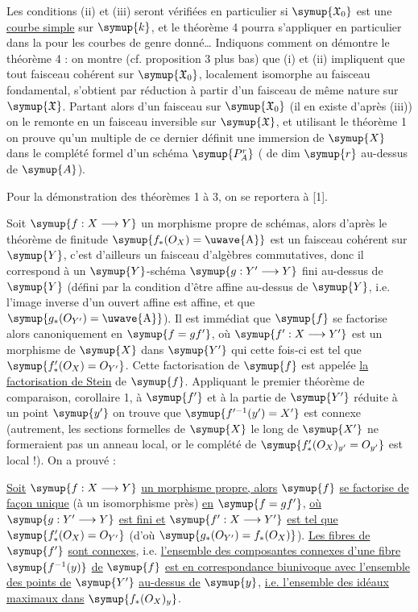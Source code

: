 Les conditions (ii) et (iii) seront vérifiées en particulier
si $\symup{\mathfrak X_0}$ est une \uline{courbe simple} sur $\symup{k}$, et le théorème 4 pourra
s'appliquer en particulier dans la  pour les courbes de
genre donné\ldots{} Indiquons comment on démontre le théorème 4 : on montre
(cf. proposition 3 plus bas) que (i) et (ii) impliquent que
tout faisceau cohérent sur $\symup{\mathfrak X_0}$, localement isomorphe au faisceau
fondamental, s'obtient par réduction à partir d'un faisceau de même nature sur
$\symup{\mathfrak X}$. Partant alors d'un faisceau  sur $\symup{\mathfrak X_0}$ (il
en existe d'après (iii)) on le remonte en un faisceau inversible sur
$\symup{\mathfrak X}$, et utilisant le théorème 1 on prouve qu'un multiple de ce
dernier définit une immersion de $\symup{X}$ dans le complété formel d'un
schéma $\symup{P_A^r}$ ( de dim $\symup{r}$ au-dessus de
$\symup{A}$).

Pour la démonstration des théorèmes 1 à 3, on se reportera à [1].


Soit $\symup{f:X\longrightarrow Y}$ un morphisme propre de schémas, alors d'après le
théorème de finitude $\symup{f_*(O_X)=\text{\uwave{A}}}$ est un faisceau cohérent sur
$\symup{Y}$, c'est d'ailleurs un faisceau d'algèbres commutatives, donc il correspond
à un $\symup{Y}$-schéma $\symup{g:Y'\longrightarrow Y}$ fini au-dessus de $\symup{Y}$ (défini par la
condition d'être affine au-dessus de $\symup{Y}$, i.e. l'image inverse d'un ouvert
affine est affine, et que $\symup{g_*(O_{Y'})=\text{\uwave{A}}}$). Il est immédiat que
$\symup{f}$ se factorise alors canoniquement en $\symup{f=gf'}$, où
$\symup{f':X\longrightarrow Y'}$ est un morphisme de $\symup{X}$ dans $\symup{Y'}$ qui cette fois-ci
est tel que $\symup{f'_*(O_X)=O_{Y'}}$. Cette factorisation de $\symup{f}$ est appelée
\uline{la factorisation de Stein} de $\symup{f}$. Appliquant le premier théorème de
comparaison, corollaire 1, à $\symup{f'}$ et à la partie de $\symup{Y'}$ réduite à un point
$\symup{y'}$ on trouve que $\symup{f'^{-1}(y')=X'}$ est connexe (autrement, les sections
formelles de $\symup{X}$ le long de $\symup{X'}$ ne formeraient pas un anneau local, or le
complété de $\symup{f'_*(O_X)_{y'}=O_{y'}}$ est local !). On a prouvé :

 \uline{Soit}
$\symup{f:X\longrightarrow Y}$ \uline{un morphisme propre, alors} $\symup{f}$ \uline{se factorise de façon
unique} (à un isomorphisme près) \uline{en} $\symup{f=gf'}$, \uline{où}
$\symup{g:Y'\longrightarrow Y}$ \uline{est fini et} $\symup{f':X\longrightarrow Y'}$ \uline{est tel que}
$\symup{f'_*(O_X)=O_{Y'}}$ (d'où
$\symup{g_*(O_{Y'})=f_*(O_X)}$). \uline{Les fibres de} $\symup{f'}$ \uline{sont connexes},
i.e.
\uline{l'ensemble des composantes connexes d'une fibre} $\symup{f^{-1}(y)}$ \uline{de} $\symup{f}$ \uline{est en
correspondance biunivoque avec l'ensemble des points de} $\symup{Y'}$ \uline{au-dessus de} $\symup{y}$,
\uline{i.e. l'ensemble des idéaux maximaux dans} $\symup{f_*(O_X)_y}$.

